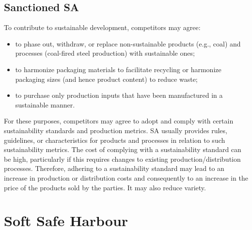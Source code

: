     \subsection{Sanctioned SA}

        To contribute to sustainable development, competitors may agree:
        \begin{itemize}
            \item to phase out, withdraw, or replace non-sustainable products (e.g., coal) and processes (coal-fired steel production) with sustainable ones;
            \item to harmonize packaging materials to facilitate recycling or harmonize packaging sizes (and hence product content) to reduce waste;
            \item to purchase only production inputs that have been manufactured in a sustainable manner.
        \end{itemize}
        
        For these purposes, competitors may agree to adopt and comply with certain sustainability standards and production metrics.  
        SA usually provides rules, guidelines, or characteristics for products and processes in relation to such sustainability metrics.  
        The cost of complying with a sustainability standard can be high, particularly if this requires changes to existing production/distribution processes. Therefore, adhering to a sustainability standard may lead to an increase in production or distribution costs and consequently to an increase in the price of the products sold by the parties. It may also reduce variety.

\section{Soft Safe Harbour}

